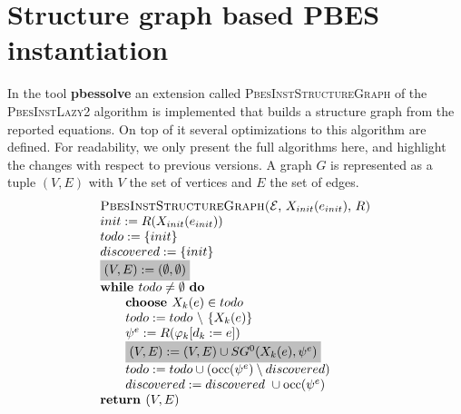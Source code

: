 \documentclass{article}
\newcommand{\Return}{\text{\textbf{return }}}
\begin{document}
\newpage
\section{Structure graph based PBES instantiation}

In the tool \textbf{pbessolve} an extension called \textsc{%
PbesInstStructureGraph} of the \textsc{PbesInstLazy2} algorithm is
implemented that builds a structure graph from the reported equations. On
top of it several optimizations to this algorithm are defined. For
readability, we only present the full algorithms here, and highlight the
changes with respect to previous versions. A graph $G$ is
represented as a tuple $(V,E)$ with $V$ the set of vertices and $E$ the set
of edges.%
\begin{equation*}
\begin{array}{l}
\text{\textsc{PbesInstStructureGraph(}}\mathcal{E}\text{, }X_{init}(e_{init})%
\text{, }R\text{\textsc{)}} \\
init:=R(X_{init}(e_{init})) \\
todo:=\{init\} \\
discovered:=\{init\} \\
\colorbox{lightgray}{$%
(V,E) :=(\emptyset ,\emptyset ) $}\\
\text{\textbf{while }}todo\neq \emptyset \text{ \textbf{do}} \\
\qquad \text{\textbf{choose }}X_{k}(e)\in todo \\
\qquad todo:=todo\ \backslash \ \{X_{k}(e)\} \\
\qquad \psi ^{e}:=R(\varphi _{k}[d_{k}:=e]) \\
\qquad \colorbox{lightgray}{$%
(V,E) := (V,E) \cup SG^{0}(X_{k}(e),\psi ^{e}) $}\\
\qquad todo:=todo\cup (\mathrm{occ}(\psi ^{e})\setminus discovered) \\
\qquad discovered:=discovered\ \cup \mathrm{occ}(\psi ^{e}) \\
\Return (V, E)%
\end{array}%
\end{equation*}
\end{document}
